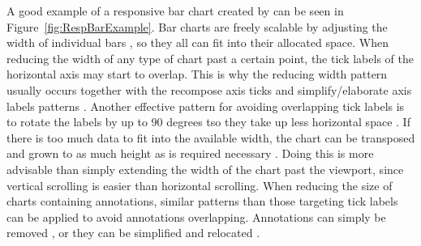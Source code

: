A good example of a responsive bar chart created by \textcite{RespVis}
can be seen in Figure~\ref{fig:RespBarExample}. Bar charts are freely
scalable by adjusting the width of individual bars
\parencite{RespHBar,RespHBarHLine,RespHBars}, so they all can fit into
their allocated space. When reducing the width of any type of chart
past a certain point, the tick labels of the horizontal axis may start
to overlap. This is why the reducing width pattern usually occurs
together with the recompose axis ticks and simplify/elaborate axis
labels patterns \parencite{RespHBars,RespHBarHLine,RespVBar}. Another
effective pattern for avoiding overlapping tick labels is to rotate
the labels by up to 90 degrees tso they take up less horizontal space
\parencite{RespVis}. If there is too much data to fit into the
available width, the chart can be transposed and grown to as much
height as is required necessary \parencite{RespVis}. Doing this is
more advisable than simply extending the width of the chart past the
viewport, since vertical scrolling is easier than horizontal
scrolling. When reducing the size of charts containing annotations,
similar patterns than those targeting tick labels can be applied to
avoid annotations overlapping. Annotations can simply be removed
\parencite{RespHStackedBar,RespHLineHStackedBar}, or they can be
simplified and relocated \parencite{RespVBar}.



